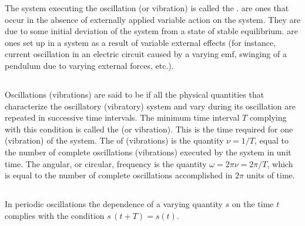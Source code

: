 The system executing the oscillation (or vibration) is called the .  are ones that occur in the absence of externally applied variable action on the system. They are due to some initial deviation of the system from a state of stable equilibrium.  are ones set up in a system as a result of variable external effects (for instance, current oscillation in an electric circuit caused by a varying emf, swinging of a pendulum due to varying external forces, etc.).

\subsection{}\label{28.1.2} Oscillations (vibrations) are said to be  if all the physical quantities that characterize the oscillatory (vibratory) system and vary during its oscillation are repeated in successive time intervals. The minimum time interval $T$ complying with this condition is called the  (or vibration). This is the time required for one  (vibration) of the system. The  of  (vibrations) is the quantity $\nu = 1/T$, equal to the number of complete oscillations (vibrations) executed by the system in unit time. The angular, or circular, frequency is the quantity $\omega = 2\pi \nu = 2\pi/T$, which is equal to the number of complete oscillations accomplished in $2\pi$ units of time.

\subsection{}\label{28.1.3} In periodic oscillations the dependence of a varying quantity $s$ on the time $t$ complies with the condition $s \,(t+ T)= s(t)$.

